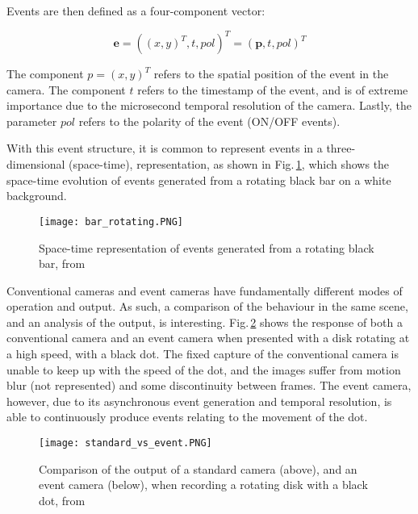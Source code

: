 Events are then defined as a four-component vector:

\begin{equation}
    \textbf{e} = \left(\left(x,y\right)^T,t,pol\right)^T = \left(\textbf{p},t,pol\right)^T
\end{equation}

The component $p=\left(x,y\right)^T$ refers to the spatial position of the event in the camera. The component $t$ refers to the timestamp of the event, and is of extreme importance due to the microsecond temporal resolution of the camera. Lastly, the parameter $pol$ refers to the polarity of the event (ON/OFF events).

With this event structure, it is common to represent events in a three-dimensional (space-time), representation, as shown in Fig.\,\ref{fig:sec2_space_time}, which shows the space-time evolution of events generated from a rotating black bar on a white background.

\begin{figure}[ht]
    \centering
    \texttt{[image: bar\_rotating.PNG]}
    \caption[Space-time representation of events generated from a rotating black bar]{Space-time representation of events generated from a rotating black bar, from \cite{clady2015asynchronous}}
    \label{fig:sec2_space_time}
\end{figure}

Conventional cameras and event cameras have fundamentally different modes of operation and output. As such, a comparison of the behaviour in the same scene, and an analysis of the output, is interesting. Fig.\,\ref{fig:sec2_standard_vs_event} shows the response of both a conventional camera and an event camera when presented with a disk rotating at a high speed, with a black dot. The fixed capture of the conventional camera is unable to keep up with the speed of the dot, and the images suffer from motion blur (not represented) and some discontinuity between frames. The event camera, however, due to its asynchronous event generation and temporal resolution, is able to continuously produce events relating to the movement of the dot.

\begin{figure}[ht]
    \centering
    \texttt{[image: standard\_vs\_event.PNG]}
    \caption[Comparison of the output of a standard camera and an event camera]{Comparison of the output of a standard camera (above), and an event camera (below), when recording a rotating disk with a black dot, from \cite{mueggler2017fast}}
    \label{fig:sec2_standard_vs_event}
\end{figure}

